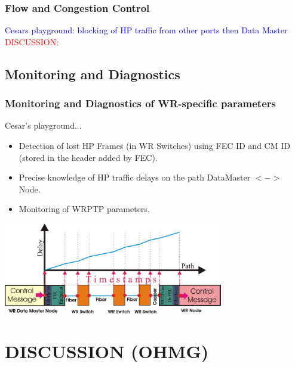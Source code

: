\documentclass[]{beamer}
\begin{document}
\begin{frame}
  \frametitle{Flow and Congestion Control}   

\textcolor{blue}{Cesars playground: blocking of HP traffic from other ports then
Data Master}
\centering
\textcolor{red}{DISCUSSION:} 

\end{frame}

\subsection{Monitoring and Diagnostics}
\begin{frame}
  \frametitle{Monitoring and Diagnostics of WR-specific parameters}   

Cesar's playground...
\begin{itemize}
 \item Detection of lost HP Frames (in WR Switches) using FEC ID and CM ID
      (stored in the header added by FEC).
 \item Precise knowledge of HP traffic delays on the path DataMaster $<->$ Node.
 \item Monitoring of WRPTP parameters.
\end{itemize}
\centering
\includegraphics[height=4cm,keepaspectratio]{robustness/delayMonitoring.pdf}

\end{frame}

\section{DISCUSSION (OHMG)}
\end{document}
